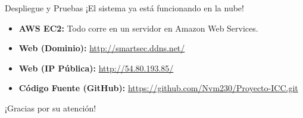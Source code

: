 \documentclass[aspectratio=169]{beamer}
\begin{document}
\begin{frame}{Despliegue y Pruebas}
¡El sistema ya está funcionando en la nube!
\vspace{0.5cm}
\begin{itemize}
    \item \textbf{AWS EC2:} Todo corre en un servidor en Amazon Web Services.
    \item \textbf{Web (Dominio):} \url{http://smartsec.ddns.net/}
    \item \textbf{Web (IP Pública):} \url{http://54.80.193.85/}
    \item \textbf{Código Fuente (GitHub):} \url{https://github.com/Nvm230/Proyecto-ICC.git}
\end{itemize}
\end{frame}

\begin{frame}[standout]
  ¡Gracias por su atención!
\end{frame}
\end{document}
